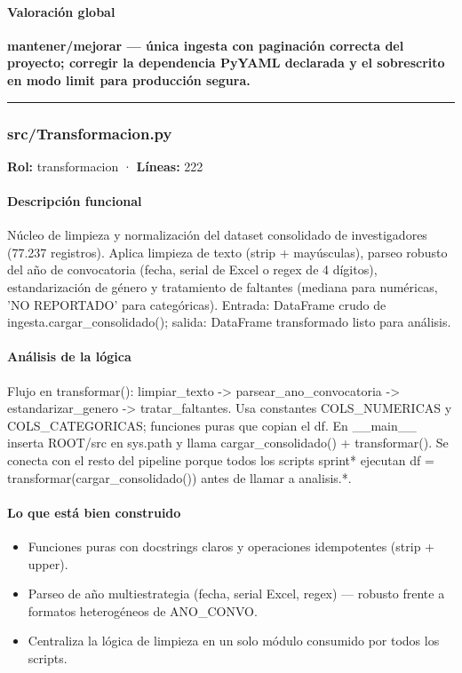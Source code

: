 \paragraph{Valoración global}
\textbf{mantener/mejorar --- única ingesta con paginación correcta del proyecto; corregir la dependencia PyYAML declarada y el sobrescrito en modo limit para producción segura.}

\medskip
\hrule

\subsubsection{src/Transformacion.py}
\textbf{Rol:} transformacion · \textbf{Líneas:} 222

\paragraph{Descripción funcional}
Núcleo de limpieza y normalización del dataset consolidado de investigadores (77.237 registros). Aplica limpieza de texto (strip + mayúsculas), parseo robusto del año de convocatoria (fecha, serial de Excel o regex de 4 dígitos), estandarización de género y tratamiento de faltantes (mediana para numéricas, 'NO REPORTADO' para categóricas). Entrada: DataFrame crudo de ingesta.cargar\_consolidado(); salida: DataFrame transformado listo para análisis.

\paragraph{Análisis de la lógica}
Flujo en transformar(): limpiar\_texto -> parsear\_ano\_convocatoria -> estandarizar\_genero -> tratar\_faltantes. Usa constantes COLS\_NUMERICAS y COLS\_CATEGORICAS; funciones puras que copian el df. En \_\_main\_\_ inserta ROOT/src en sys.path y llama cargar\_consolidado() + transformar(). Se conecta con el resto del pipeline porque todos los scripts sprint* ejecutan df = transformar(cargar\_consolidado()) antes de llamar a analisis.*.

\paragraph{Lo que está bien construido}
\begin{itemize}
  \item Funciones puras con docstrings claros y operaciones idempotentes (strip + upper).
  \item Parseo de año multiestrategia (fecha, serial Excel, regex) --- robusto frente a formatos heterogéneos de ANO\_CONVO.
  \item Centraliza la lógica de limpieza en un solo módulo consumido por todos los scripts.
\end{itemize}

